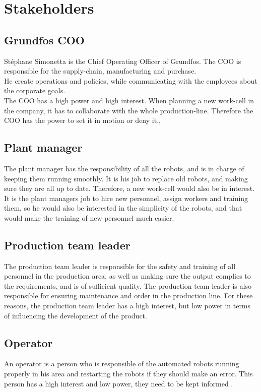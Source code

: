 \section{Stakeholders}


\subsection{Grundfos COO}\label{ch:grundfosas-CEO}
Stéphane Simonetta is the Chief Operating Officer of Grundfos. The COO is responsible for the supply-chain, manufacturing and purchase.\\ 
He create operations and policies, while communicating with the employees about the corporate goals.\\
The COO has a high power and high interest. When planning a new work-cell in the company, it has to collaborate with the whole production-line. Therefore the COO has the power to set it in motion or deny it.\cite{Grundfos},\cite{COO}\\

\subsection{Plant manager}\label{ch:Plant-manager} 
The plant manager has the responsibility of all the robots, and is in charge of keeping them running smoothly. It is his job to replace old robots, and making sure they are all up to date. Therefore, a new work-cell would also be in interest. It is the plant managers job to hire new personnel, assign workers and training them, so he would also be interested in the simplicity of the robots, and that would make the training of new personnel much easier. \cite{plantmanager} \\

\subsection{Production team leader}\label{ch:Production-team-leader}
The production team leader is responsible for the safety and training of all personnel in the production area, as well as making sure the output complies to the requirements, and is of sufficient quality. The production team leader is also responsible for ensuring maintenance and order in the production line. For these reasons, the production team leader has a high interest, but low power in terms of influencing the development of the product. \cite{Productionteamleader} 


\subsection{Operator}\label{ch:grundfosemp-stake}
An operator is a person who is responsible of the automated robots running properly in his area and restarting the robots if they should make an error. This person has a high interest and low power, they need to be kept informed \cite{Operator}.\\ 

